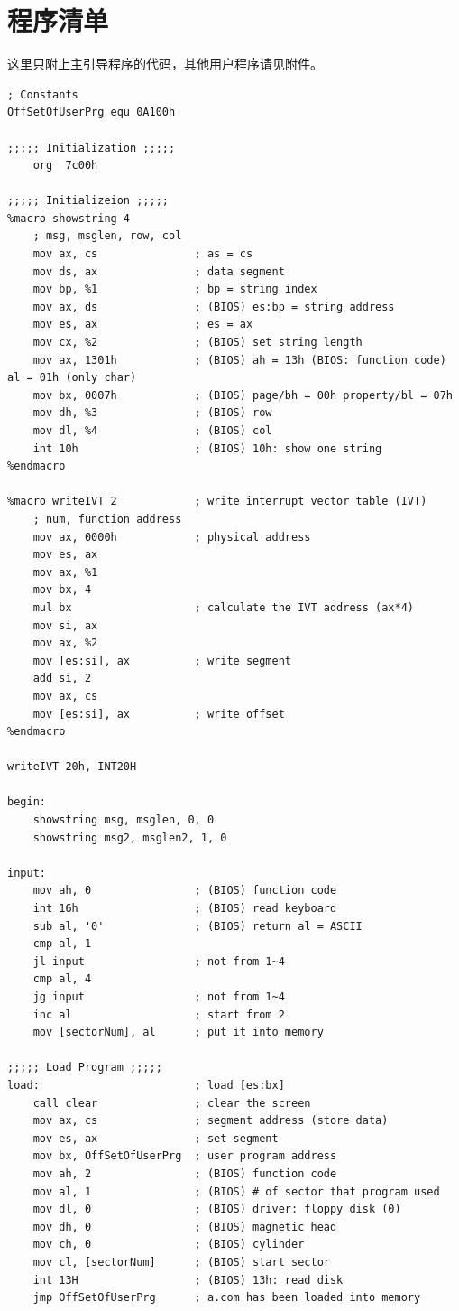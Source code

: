\documentclass[logo,reportComp]{thesis}
\begin{document}
\appendix
\appendixconfig
\section{程序清单}
\label{sec:code}
这里只附上主引导程序的代码，其他用户程序请见附件。
\begin{lstlisting}[language={[x86masm]Assembler}]
; Constants
OffSetOfUserPrg equ 0A100h

;;;;; Initialization ;;;;;
    org  7c00h

;;;;; Initializeion ;;;;;
%macro showstring 4
    ; msg, msglen, row, col
    mov ax, cs               ; as = cs
    mov ds, ax               ; data segment
    mov bp, %1               ; bp = string index
    mov ax, ds               ; (BIOS) es:bp = string address
    mov es, ax               ; es = ax
    mov cx, %2               ; (BIOS) set string length
    mov ax, 1301h            ; (BIOS) ah = 13h (BIOS: function code) al = 01h (only char)
    mov bx, 0007h            ; (BIOS) page/bh = 00h property/bl = 07h
    mov dh, %3               ; (BIOS) row
    mov dl, %4               ; (BIOS) col
    int 10h                  ; (BIOS) 10h: show one string
%endmacro

%macro writeIVT 2            ; write interrupt vector table (IVT)
    ; num, function address
    mov ax, 0000h            ; physical address
    mov es, ax
    mov ax, %1
    mov bx, 4
    mul bx                   ; calculate the IVT address (ax*4)
    mov si, ax
    mov ax, %2
    mov [es:si], ax          ; write segment
    add si, 2
    mov ax, cs
    mov [es:si], ax          ; write offset
%endmacro

writeIVT 20h, INT20H

begin:
    showstring msg, msglen, 0, 0
    showstring msg2, msglen2, 1, 0

input:
    mov ah, 0                ; (BIOS) function code
    int 16h                  ; (BIOS) read keyboard
    sub al, '0'              ; (BIOS) return al = ASCII
    cmp al, 1
    jl input                 ; not from 1~4
    cmp al, 4
    jg input                 ; not from 1~4
    inc al                   ; start from 2
    mov [sectorNum], al      ; put it into memory

;;;;; Load Program ;;;;;
load:                        ; load [es:bx]
    call clear               ; clear the screen
    mov ax, cs               ; segment address (store data)
    mov es, ax               ; set segment
    mov bx, OffSetOfUserPrg  ; user program address
    mov ah, 2                ; (BIOS) function code
    mov al, 1                ; (BIOS) # of sector that program used
    mov dl, 0                ; (BIOS) driver: floppy disk (0)
    mov dh, 0                ; (BIOS) magnetic head
    mov ch, 0                ; (BIOS) cylinder
    mov cl, [sectorNum]      ; (BIOS) start sector
    int 13H                  ; (BIOS) 13h: read disk
    jmp OffSetOfUserPrg      ; a.com has been loaded into memory


\end{lstlisting}
\end{document}
